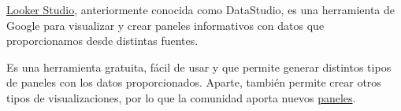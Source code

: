 \href{https://lookerstudio.google.com/}{Looker Studio}, anteriormente conocida como DataStudio, es una herramienta de Google para visualizar y crear paneles informativos con datos que proporcionamos desde distintas fuentes.

Es una herramienta gratuita, fácil de usar y que permite generar distintos tipos de paneles con los datos proporcionados. Aparte, también permite crear otros tipos de visualizaciones, por lo que la comunidad aporta nuevos \href{https://lookerstudio.google.com/visualization}{paneles}.

